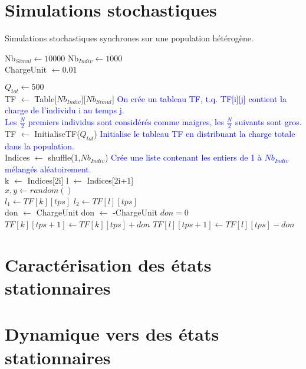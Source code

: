 \section{Simulations stochastiques}

\begin{algorithm}
\caption{Simulations stochastiques synchrones sur une population hétérogène.}
\begin{algorithmic}

\State Nb$_{Simul} \gets 10000$
\State Nb$_{Indiv} \gets 1000$\\

\State ChargeUnit $\gets 0.01$

\State $Q_{tot} \gets 500$\\


\State TF $\gets$ Table[$Nb_{Indiv}$][$Nb_{Simul}$]
\State \textcolor{blue}{On crée un tableau TF, t.q. TF[i][j] contient la charge de l'individu i au temps j.\\
Les $\frac{N}{2}$ premiers individus sont considérés comme maigres, les $\frac{N}{2}$ suivants sont gros.}\\
\State TF $\gets$ InitialiseTF($Q_{tot}$)
\State \textcolor{blue}{Initialise le tableau TF en distribuant la charge totale dans la population.}\\

	\State Indices $\gets$ shuffle(1,$Nb_{Indiv}$) 
	\State \textcolor{blue}{Crée une liste contenant les entiers de 1 à $Nb_{Indiv}$ mélangés aléatoirement.}\\
		\State k $\gets$ Indices[2i]
		\State l $\gets$ Indices[2i+1] \\
		
		\State $x,y \gets random()$\\
		
		\State $l_1 \gets TF[k][tps]$
		\State $l_2 \gets TF[l][tps]$\\
		
			\State don $\gets$ ChargeUnit 
			\State don $\gets$ -ChargeUnit 
		\Else
			\State $don=0$
		\EndIf \\
		
		\State $TF[k][tps+1] \gets TF[k][tps]+don$
        \State $TF[l][tps+1] \gets TF[l][tps]-don$\\
	\EndFor
\EndFor



\end{algorithmic}
\end{algorithm}

\section{Caractérisation des états stationnaires}

\section{Dynamique vers des états stationnaires}

